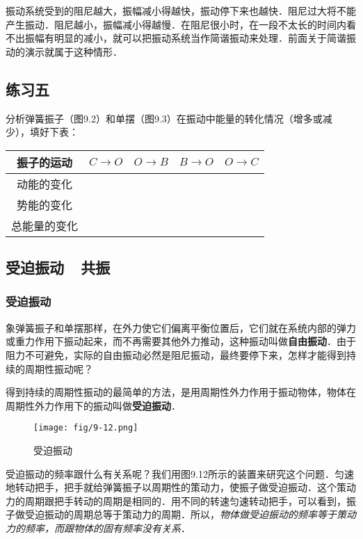 振动系统受到的阻尼越大，振幅减小得越快，振动停下来也越快．阻尼过大将不能产生振动．阻尼越小，振幅减小得越慢．在阻尼很小时，在一段不太长的时间内看不出振幅有明显的减小，就可以把振动系统当作简谐振动来处理．前面关于简谐振动的演示就属于这种情形．

\subsection*{练习五}
分析弹簧振子（图9.2）和单摆（图9.3）在振动中能量的转化情况（增多或减少），填好下表：

\begin{center}
    \begin{tabular}{c|c|c|c|c}
        \hline
        振子的运动  & $C\to O$ & $O\to B$ & $B\to O$ & $O\to C$\\
        \hline
动能的变化  &&&&\\
势能的变化&&&&\\
总能量的变化&&&&\\
\hline
    \end{tabular}
\end{center}

\subsection{受迫振动~~共振}

\subsubsection{受迫振动}

象弹簧振子和单摆那样，在外力使它们偏离平衡位置后，它们就在系统内部的弹力或重力作用下振动起来，而不再需要其他外力推动，这种振动叫做\textbf{自由振动}．由于阻力不可避免，实际的自由振动必然是阻尼振动，最终要停下来，怎样才能得到持续的周期性振动呢？

得到持续的周期性振动的最简单的方法，是用周期性外力作用于振动物体，物体在周期性外力作用下的振动叫做\textbf{受迫振动}．
\begin{figure}[htp]\centering
    \texttt{[image: fig/9-12.png]}
    \caption{受迫振动}
    \end{figure}

受迫振动的频率跟什么有关系呢？我们用图9.12所示的装置来研究这个问题．匀速地转动把手，把手就给弹簧振子以周期性的策动力，使振子做受迫振动．这个策动力的周期跟把手转动的周期是相同的．用不同的转速匀速转动把手，可以看到，振子做受迫振动的周期总等于策动力的周期．所以，\textit{物体做受迫振动的频率等于策动力的频率，而跟物体的固有频率没有关系}．

